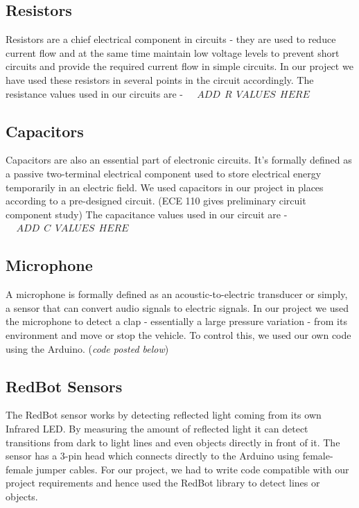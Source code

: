 \documentclass[12pt,a4paper]{article}
\begin{document}
\begin{large}
\subsection{Resistors}

Resistors are a chief electrical component in circuits - they are used to reduce current flow and at the same time maintain low voltage levels  to prevent short circuits and provide the required current flow in simple circuits. In our project we have used these resistors in several points in the circuit accordingly. The resistance values used in our circuits are - $~~~~~ADD ~~R~~ VALUES ~~HERE~~~~$\\


\subsection{Capacitors}

Capacitors are also an essential part of electronic circuits. It's formally defined as a passive two-terminal electrical component used to store electrical energy temporarily in an electric field. We used capacitors in our project in places according to a pre-designed circuit. (ECE 110 gives preliminary circuit component study) The capacitance values used in our circuit are - $~~~~~ADD ~~C~~ VALUES ~~HERE~~~~$

\subsection{Microphone}

A microphone is formally defined as an acoustic-to-electric transducer or simply, a sensor that can convert audio signals to electric signals. In our project we used the microphone to detect a clap - essentially a large pressure variation - from its environment and move or stop the vehicle. To control this, we used our own code using the Arduino. (\textit{code posted below})
\subsection{RedBot Sensors}

The RedBot sensor works by detecting reflected light coming from its own Infrared LED. By measuring the amount of reflected light it can detect transitions from dark to light lines and even objects directly in front of it. The sensor has a 3-pin head which connects directly to the Arduino using female-female jumper cables. For our project, we had to write code compatible with our project requirements and hence used the RedBot library to detect lines or objects. \\


\end{large}
\end{document}
